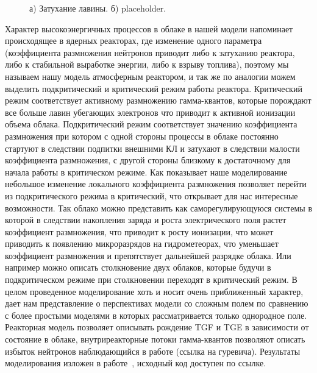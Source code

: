 \begin{figure}[t]
    \begin{center}
        \begin{minipage}[h]{0.49\linewidth}
        \end{minipage}
        \hfill
        \begin{minipage}[h]{0.49\linewidth}
        \end{minipage}
        \caption{а) Затухание лавины. б) placeholder.}
    \end{center}
    \label{thunder:rl_2}
\end{figure}

Характер высокоэнергичных процессов в облаке в нашей модели напоминает происходящее в ядерных реакторах, где изменение одного параметра (коэффициента размножения нейтронов приводит либо к затуханию реактора, либо к стабильной выработке энергии, либо к взрыву топлива), поэтому мы называем нашу модель атмосферным реактором, и так же по аналогии можем выделить подкритический и критический режим работы реактора. Критический режим соответствует активному размножению гамма-квантов, которые порождают все больше лавин убегающих электронов что приводит к активной ионизации объема облака. Подкритический режим соответствует значению коэффициента размножения  при котором с одной стороны процессы в облаке постоянно стартуют в следствии подпитки внешними КЛ и затухают в следствии малости коэффициента размножения, с другой стороны  близкому к достаточному для начала работы в критическом режиме. Как показывает наше моделирование небольшое изменение локального коэффициента размножения позволяет перейти из подкритического режима в критический, что открывает для нас интересные возможности. Так облако можно представить как саморегулирующуюся системы в которой в следствии накопления заряда и роста электрического поля растет коэффициент размножения, что приводит к росту ионизации, что может приводить к появлению микроразрядов на гидрометеорах, что уменьшает коэффициент размножения и препятствует дальнейшей разрядке облака. Или например можно описать столкновение двух облаков, которые будучи в подкритическом режиме при столкновении переходят в критический режим. В целом проведенное моделирование хоть и носит очень приближенный характер, дает нам представление о перспективах модели со сложным полем по сравнению с более простыми моделями в которых рассматривается только однородное поле. Реакторная модель позволяет описывать рождение TGF и TGE в зависимости от состояние в облаке, внутриреакторные потоки гамма-квантов позволяют описать избыток нейтронов наблюдающийся в работе (ссылка на гуревича). Результаты моделирования изложен в работе~\cite{reactor}, исходный код доступен по ссылке.

